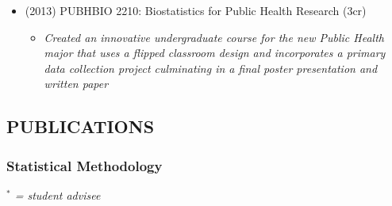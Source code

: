 \documentclass[
  english,
  letterpaper,
  DIV=11,
  numbers=noendperiod]{scrartcl}
\providecommand{\tightlist}{%
  \setlength{\itemsep}{0pt}\setlength{\parskip}{0pt}}
\begin{document}
\begin{itemize}
  \begin{itemize}
  \tightlist
  \item
    \emph{Redesigned the traditional in-person course and converted to
    100\% online delivery mode}
  \end{itemize}
\item
  (2013) PUBHBIO 2210: Biostatistics for Public Health Research (3cr)

  \begin{itemize}
  \tightlist
  \item
    \emph{Created an innovative undergraduate course for the new Public
    Health major that uses a flipped classroom design and incorporates a
    primary data collection project culminating in a final poster
    presentation and written paper}
  \end{itemize}
\end{itemize}

\subsection{PUBLICATIONS}\label{publications}

\subsubsection{Statistical Methodology}\label{statistical-methodology}

\emph{\(^*\) = student advisee}
\end{document}
